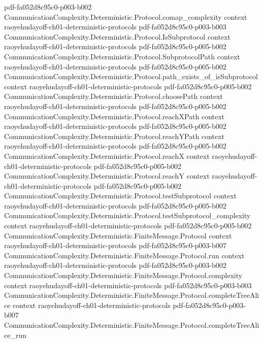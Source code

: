 \begin{theorem}
  {pdf-fa052d8c95c0-p003-b002}
\proofstep
  {CommunicationComplexity.Deterministic.Protocol.comap_complexity}
  {context}
  {raoyehudayoff-ch01-deterministic-protocols}
  {pdf-fa052d8c95c0-p003-b003}
\proofstep
  {CommunicationComplexity.Deterministic.Protocol.IsSubprotocol}
  {context}
  {raoyehudayoff-ch01-deterministic-protocols}
  {pdf-fa052d8c95c0-p005-b002}
\proofstep
  {CommunicationComplexity.Deterministic.Protocol.SubprotocolPath}
  {context}
  {raoyehudayoff-ch01-deterministic-protocols}
  {pdf-fa052d8c95c0-p005-b002}
\proofstep
  {CommunicationComplexity.Deterministic.Protocol.path_exists_of_isSubprotocol}
  {context}
  {raoyehudayoff-ch01-deterministic-protocols}
  {pdf-fa052d8c95c0-p005-b002}
\proofstep
  {CommunicationComplexity.Deterministic.Protocol.choosePath}
  {context}
  {raoyehudayoff-ch01-deterministic-protocols}
  {pdf-fa052d8c95c0-p005-b002}
\proofstep
  {CommunicationComplexity.Deterministic.Protocol.reachXPath}
  {context}
  {raoyehudayoff-ch01-deterministic-protocols}
  {pdf-fa052d8c95c0-p005-b002}
\proofstep
  {CommunicationComplexity.Deterministic.Protocol.reachYPath}
  {context}
  {raoyehudayoff-ch01-deterministic-protocols}
  {pdf-fa052d8c95c0-p005-b002}
\proofstep
  {CommunicationComplexity.Deterministic.Protocol.reachX}
  {context}
  {raoyehudayoff-ch01-deterministic-protocols}
  {pdf-fa052d8c95c0-p005-b002}
\proofstep
  {CommunicationComplexity.Deterministic.Protocol.reachY}
  {context}
  {raoyehudayoff-ch01-deterministic-protocols}
  {pdf-fa052d8c95c0-p005-b002}
\proofstep
  {CommunicationComplexity.Deterministic.Protocol.testSubprotocol}
  {context}
  {raoyehudayoff-ch01-deterministic-protocols}
  {pdf-fa052d8c95c0-p005-b002}
\proofstep
  {CommunicationComplexity.Deterministic.Protocol.testSubprotocol_complexity}
  {context}
  {raoyehudayoff-ch01-deterministic-protocols}
  {pdf-fa052d8c95c0-p005-b002}
\proofstep
  {CommunicationComplexity.Deterministic.FiniteMessage.Protocol}
  {context}
  {raoyehudayoff-ch01-deterministic-protocols}
  {pdf-fa052d8c95c0-p003-b007}
\proofstep
  {CommunicationComplexity.Deterministic.FiniteMessage.Protocol.run}
  {context}
  {raoyehudayoff-ch01-deterministic-protocols}
  {pdf-fa052d8c95c0-p003-b002}
\proofstep
  {CommunicationComplexity.Deterministic.FiniteMessage.Protocol.complexity}
  {context}
  {raoyehudayoff-ch01-deterministic-protocols}
  {pdf-fa052d8c95c0-p003-b003}
\proofstep
  {CommunicationComplexity.Deterministic.FiniteMessage.Protocol.completeTreeAlice}
  {context}
  {raoyehudayoff-ch01-deterministic-protocols}
  {pdf-fa052d8c95c0-p003-b007}
\proofstep
  {CommunicationComplexity.Deterministic.FiniteMessage.Protocol.completeTreeAlice_run}

\end{theorem}

